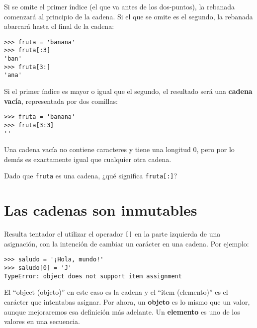 Si se omite el primer índice (el que va antes de los dos-puntos), la rebanada comenzará
al principio de la cadena. Si el que se omite es el segundo, la rebanada
abarcará hasta el final de la cadena: 

\beforeverb
\begin{verbatim}
>>> fruta = 'banana'
>>> fruta[:3]
'ban'
>>> fruta[3:]
'ana'
\end{verbatim}
\afterverb
%
Si el primer índice es mayor o igual que el segundo, el resultado será
una {\bf cadena vacía}, representada por dos comillas:


\beforeverb
\begin{verbatim}
>>> fruta = 'banana'
>>> fruta[3:3]
''
\end{verbatim}
\afterverb
%
Una cadena vacía no contiene caracteres y tiene una longitud 0, pero por
lo demás es exactamente igual que cualquier otra cadena.

\begin{ex}
Dado que {\tt fruta} es una cadena, ¿qué significa
{\tt fruta[:]}?



\end{ex}


\section{Las cadenas son inmutables}

Resulta tentador el utilizar el operador {\tt []} en la parte izquierda de una
asignación, con la intención de cambiar un carácter en una cadena.
Por ejemplo:


\beforeverb
\begin{verbatim}
>>> saludo = '¡Hola, mundo!'
>>> saludo[0] = 'J'
TypeError: object does not support item assignment
\end{verbatim}
\afterverb
%
El ``object (objeto)'' en este caso es la cadena y el ``item (elemento)'' es
el carácter que intentabas asignar. Por ahora, un {\bf objeto} es
lo mismo que un valor, aunque mejoraremos esa definición más adelante.
Un {\bf elemento} es uno de los valores en una secuencia.


